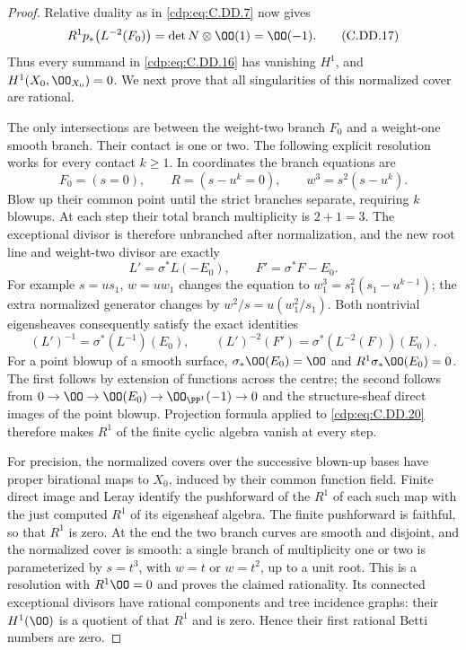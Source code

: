 \begin{proof}
Relative duality as in \eqref{cdp:eq:C.DD.7} now gives
\[
 R^1p_*\bigl(L^{-2}(F_0)\bigr)
                       =\det N\otimes\OO(1)=\OO(-1).
\tag{C.DD.17}\label{cdp:eq:C.DD.17}
\]
Thus every summand in \eqref{cdp:eq:C.DD.16} has vanishing
$H^1$, and $H^1(X_0,\OO_{X_0})=0$.
We next prove that all singularities of this
normalized cover are rational.

The only intersections are between the weight-two
branch $F_0$ and a weight-one smooth branch. Their
contact is one or two. The following explicit
resolution works for every contact $k\ge1$.
In coordinates the branch equations are
\[
                F_0=(s=0),\qquad R=(s-u^k=0),
                \qquad w^3=s^2(s-u^k).
\tag{C.DD.18}\label{cdp:eq:C.DD.18}
\]
Blow up their common point until the strict
branches separate, requiring $k$ blowups. At
each step their total branch multiplicity is
$2+1=3$. The exceptional divisor is therefore
unbranched after normalization, and the new
root line and weight-two divisor are exactly
\[
 L'=\sigma^*L(-E_0),\qquad
 F'=\sigma^*F-E_0.
\tag{C.DD.19}\label{cdp:eq:C.DD.19}
\]
For example $s=u s_1$, $w=u w_1$ changes the
equation to
$w_1^3=s_1^2(s_1-u^{k-1})$; the extra normalized
generator changes by
$w^2/s=u(w_1^2/s_1)$.
Both nontrivial eigensheaves consequently satisfy
the exact identities
\[
 (L')^{-1}=\sigma^*(L^{-1})(E_0),\qquad
 (L')^{-2}(F')=\sigma^*(L^{-2}(F))(E_0).
\tag{C.DD.20}\label{cdp:eq:C.DD.20}
\]
For a point blowup of a smooth surface,
$\sigma_*\OO(E_0)=\OO$ and
$R^1\sigma_*\OO(E_0)=0$.
The first follows by extension of functions across
the centre; the second follows from
$0\to\OO\to\OO(E_0)\to\OO_{\PP^1}(-1)\to0$
and the structure-sheaf direct images of the
point blowup. Projection formula applied to
\eqref{cdp:eq:C.DD.20} therefore makes $R^1$ of the finite
cyclic algebra vanish at every step.

For precision, the normalized covers over the
successive blown-up bases have proper birational
maps to $X_0$, induced by their common function
field. Finite direct image and Leray identify the
pushforward of the $R^1$ of each such map with
the just computed $R^1$ of its eigensheaf algebra.
The finite pushforward is faithful, so that $R^1$
is zero. At the end the two branch curves are
smooth and disjoint, and the normalized cover
is smooth: a single branch of multiplicity one
or two is parameterized by $s=t^3$, with $w=t$
or $w=t^2$, up to a unit root. This is a resolution
with $R^1\OO=0$ and proves the claimed rationality.
Its connected exceptional divisors have rational
components and tree incidence graphs: their
$H^1(\OO)$ is a quotient of that $R^1$ and is zero.
Hence their first rational Betti numbers are zero.


\end{proof}
